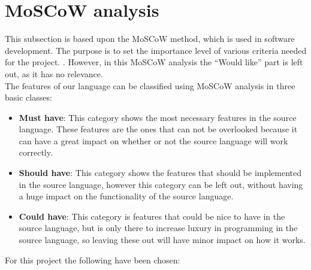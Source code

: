 \section{MoSCoW analysis}\label{analysis:moscow}
This subsection is based upon the MoSCoW method, which is used in software development. The purpose is to set the importance level of various criteria needed for the project. \cite{moscow}. However, in this MoSCoW analysis the ``Would like'' part is left out, as it has no relevance. \\

The features of our language can be classified using MoSCoW analysis in three basic classes:
\begin{itemize}
\item \textbf{Must have}: This category shows the most necessary features in the source language. These features are the ones that can not be overlooked because it can have a great impact on whether or not the source language will
work correctly. 

\item \textbf{Should have}: This category shows the features that should be implemented in the source language, however this category can be left out, without having a huge impact on the functionality of the source language. 

\item \textbf{Could have}: This category is features that could be nice to have in the source language, but is only there to increase luxury in programming in the source language, so leaving these out will have minor impact on how it works. 
\end{itemize}


For this project the following have been chosen:\\

